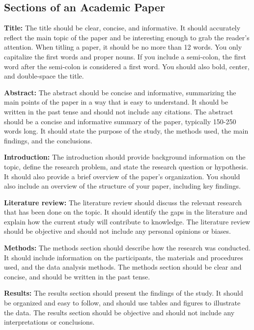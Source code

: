 \documentclass[
  b5paper]{book}
\begin{document}
\hypertarget{sections-of-an-academic-paper}{%
\subsection*{Sections of an Academic Paper}\label{sections-of-an-academic-paper}}

\textbf{Title:} The title should be clear, concise, and informative. It should accurately reflect the main topic of the paper and be interesting enough to grab the reader's attention. When titling a paper, it should be no more than 12 words. You only capitalize the first words and proper nouns. If you include a semi-colon, the first word after the semi-colon is considered a first word. You should also bold, center, and double-space the title.

\textbf{Abstract:} The abstract should be concise and informative, summarizing the main points of the paper in a way that is easy to understand. It should be written in the past tense and should not include any citations. The abstract should be a concise and informative summary of the paper, typically 150-250 words long. It should state the purpose of the study, the methods used, the main findings, and the conclusions.

\textbf{Introduction:} The introduction should provide background information on the topic, define the research problem, and state the research question or hypothesis. It should also provide a brief overview of the paper's organization. You should also include an overview of the structure of your paper, including key findings.

\textbf{Literature review:} The literature review should discuss the relevant research that has been done on the topic. It should identify the gaps in the literature and explain how the current study will contribute to knowledge. The literature review should be objective and should not include any personal opinions or biases.

\textbf{Methods:} The methods section should describe how the research was conducted. It should include information on the participants, the materials and procedures used, and the data analysis methods. The methods section should be clear and concise, and should be written in the past tense.

\textbf{Results:} The results section should present the findings of the study. It should be organized and easy to follow, and should use tables and figures to illustrate the data. The results section should be objective and should not include any interpretations or conclusions.
\end{document}
